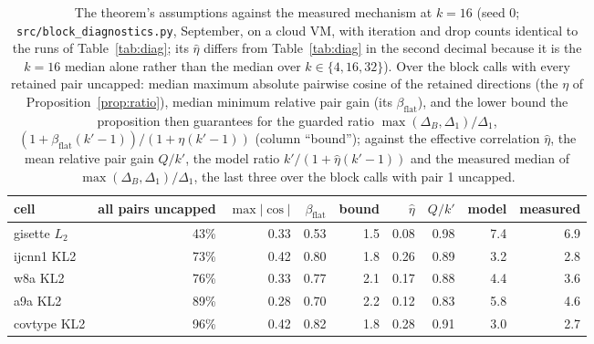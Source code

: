 \begin{table}[t]\centering\scriptsize\setlength{\tabcolsep}{2.5pt}
\caption{The theorem's assumptions against the measured mechanism at
$k=16$ (seed 0; \texttt{src/block\_diagnostics.py}, September, on a cloud VM,
with iteration and drop counts identical to the runs of
Table~\ref{tab:diag}; its $\hat\eta$ differs from Table~\ref{tab:diag}
in the second decimal because it is the $k=16$ median alone rather than
the median over $k\in\{4,16,32\}$). Over the
block calls with every retained pair uncapped: median maximum absolute
pairwise cosine of the retained directions (the $\eta$ of
Proposition~\ref{prop:ratio}), median minimum relative pair gain (its
$\beta_{\mathrm{flat}}$), and the lower bound the proposition then
guarantees for the guarded ratio $\max(\Delta_B,\Delta_1)/\Delta_1$,
$(1+\beta_{\mathrm{flat}}(k'-1))/(1+\eta(k'-1))$ (column ``bound''); against
the effective correlation $\hat\eta$, the mean relative pair gain
$Q/k'$, the model ratio $k'/(1+\hat\eta(k'-1))$ and the measured median
of $\max(\Delta_B,\Delta_1)/\Delta_1$, the last three over the block
calls with pair 1 uncapped.}\label{tab:assump}
\begin{tabular}{lrrrrrrrr}\toprule
cell & all pairs uncapped & $\max|\cos|$ & $\beta_{\mathrm{flat}}$ & bound & $\hat\eta$ & $Q/k'$ & model & measured \\\midrule
gisette $L_2$ & 43\% & 0.33 & 0.53 & 1.5 & 0.08 & 0.98 & 7.4 & 6.9 \\
ijcnn1 KL2 & 73\% & 0.42 & 0.80 & 1.8 & 0.26 & 0.89 & 3.2 & 2.8 \\
w8a KL2 & 76\% & 0.33 & 0.77 & 2.1 & 0.17 & 0.88 & 4.4 & 3.6 \\
a9a KL2 & 89\% & 0.28 & 0.70 & 2.2 & 0.12 & 0.83 & 5.8 & 4.6 \\
covtype KL2 & 96\% & 0.42 & 0.82 & 1.8 & 0.28 & 0.91 & 3.0 & 2.7 \\
\bottomrule\end{tabular}\end{table}

